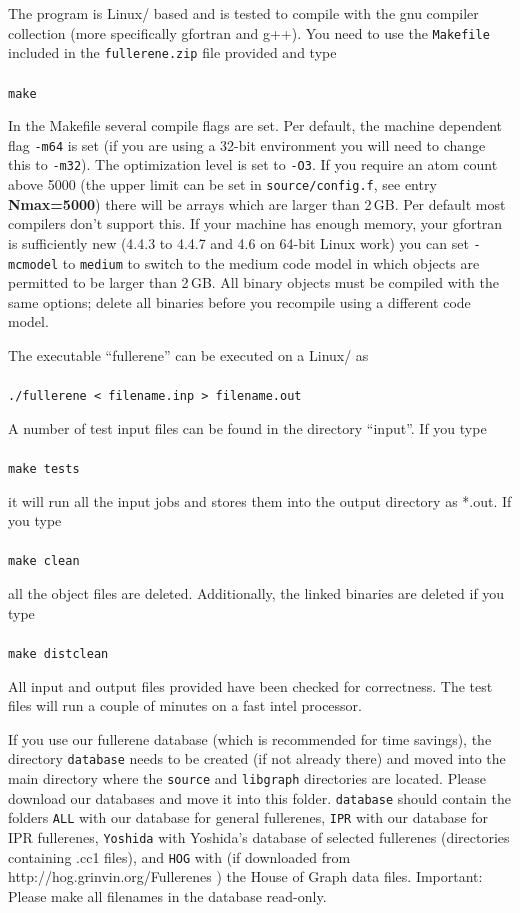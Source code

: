 \documentclass[article,a4paper,twoside]{memoir}
\let\acr=\textsmaller
\newcommand{\filename}[1]{\texttt{#1}}
\newcommand{\paramname}[1]{{\color{green}\textbf{#1}}}
\begin{document}
The program is Linux/\acr{UNIX} based and is tested to compile with the gnu compiler collection (more specifically gfortran and g++).
You need to use the \filename{Makefile} included in the \filename{fullerene.zip} file provided and type\\\\
\verb|make|

In the Makefile several compile flags are set.  Per default, the machine dependent flag \verb|-m64| is set (if you are
using a 32-bit environment you will need to change this to \verb|-m32|).  The optimization level is set to \verb|-O3|.  
If you require an atom count above 5000 (the upper limit can be set in \filename{source/config.f}, see entry \paramname{Nmax=5000})
there will be arrays which are larger than 2\,GB.  Per default most compilers don't support this. 
If your machine has enough memory, your gfortran is sufficiently new
(4.4.3 to 4.4.7  and 4.6 on 64-bit Linux work) you can set \verb|-mcmodel| to \verb|medium| to switch to the medium code model in
which objects are permitted to be larger than 2\,GB.  All binary objects must be compiled with the same options; delete all
binaries before you recompile using a different code model. 

The executable ``fullerene'' can be executed on a Linux/\acr{UNIX} as\\\\
\verb|./fullerene < filename.inp > filename.out|

A number of test input files can be found in the directory ``input''. If you type\\\\
\verb|make tests|

it will run all the input jobs and stores them into the output directory as *.out. If you type\\\\
\verb|make clean|

all the object files are deleted. Additionally, the linked binaries are deleted if you type\\\\
\verb|make distclean|

All input and output files provided have been checked for correctness. The test files will run a couple of minutes
on a fast intel processor.

If you use our fullerene database (which is recommended for time savings), the directory \filename{database} needs 
to be created (if not already there) and moved into the main directory where the \filename{source} and \filename{libgraph} 
directories are located. Please download our databases and move it into this folder. \filename{database} should contain
the folders \filename{ALL} with our database for general fullerenes, \filename{IPR} with our database 
for IPR fullerenes, \filename{Yoshida} with Yoshida's database of selected fullerenes (directories containing .cc1 files),
and \filename{HOG} with (if downloaded from http://hog.grinvin.org/Fullerenes ) the House of Graph data files. Important: 
Please make all filenames in the database read-only.
\end{document}
